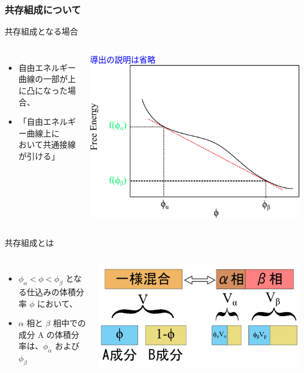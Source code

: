\documentclass[unicode,12pt]{beamer}%
\begin{document}
\begin{frame}
	\frametitle{共存組成について}
		\vspace{-3mm}
		\begin{block}{共存組成となる場合}
			\begin{columns}[c, onlytextwidth]
					\begin{itemize}
						\item 自由エネルギー曲線の\alert{一部が上に凸}になった場合、
						\item 「自由エネルギー曲線上に\\おいて\alert{共通接線が引ける}」
					\end{itemize}
					\textcolor{blue}{導出の説明は省略}
						\centering
							\includegraphics[width=.9\textwidth]{freeEform_4.png}
			\end{columns}
		\end{block}
		\vspace{-3mm}
		\begin{alertblock}{共存組成とは}
			\begin{columns}[c, onlytextwidth]
				\begin{itemize}
					\item $\phi_\alpha < \phi  < \phi_\beta$ となる仕込みの体積分率 $\phi$ において、 
					\item $\alpha$ 相と $\beta$ 相中での成分 A の体積分率は、$\phi_\alpha$ および $\phi_\beta$
				\end{itemize}
				\centering
				\includegraphics[width=\textwidth]{freeEform_1.png}

\end{columns}
\end{alertblock}
\end{frame}
\end{document}
